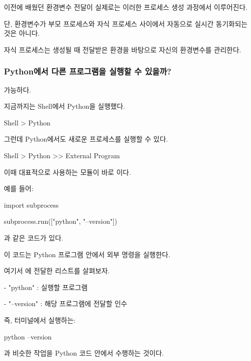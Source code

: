 이전에 배웠던 환경변수 전달이 실제로는 이러한 프로세스 생성 과정에서 이루어진다.

단, 환경변수가 부모 프로세스와 자식 프로세스 사이에서 자동으로 실시간 동기화되는 것은 아니다.

자식 프로세스는 생성될 때 전달받은 환경을 바탕으로 자신의 환경변수를 관리한다.

\subsubsection{Python에서 다른 프로그램을 실행할 수 있을까?}

가능하다.

지금까지는 Shell에서 Python을 실행했다.

\begin{dhkdir}
Shell
> Python
\end{dhkdir}

그런데 Python에서도 새로운 프로세스를 실행할 수 있다.

\begin{dhkdir}
Shell
> Python
>> External Program
\end{dhkdir}

이때 대표적으로 사용하는 모듈이 바로 이다.

예를 들어:

\begin{dhkcode}
import subprocess

subprocess.run(["python", "--version"])
\end{dhkcode}

과 같은 코드가 있다.

이 코드는 Python 프로그램 안에서 외부 명령을 실행한다.

여기서 에 전달한 리스트를 살펴보자.

\begin{dhkzsh}
\end{dhkzsh}

\begin{dhksmry}
    - "python" : 실행할 프로그램

    - "--version" : 해당 프로그램에 전달할 인수
\end{dhksmry}

즉, 터미널에서 실행하는:

\begin{dhkzsh}
python --version
\end{dhkzsh}

과 비슷한 작업을 Python 코드 안에서 수행하는 것이다.

